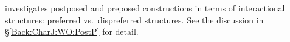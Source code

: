  investigates postposed and preposed constructions
in terms of interactional structures:
preferred vs.~dispreferred structures.
See the discussion in \S \ref{Back:CharJ:WO:PostP} for detail.
%
%

